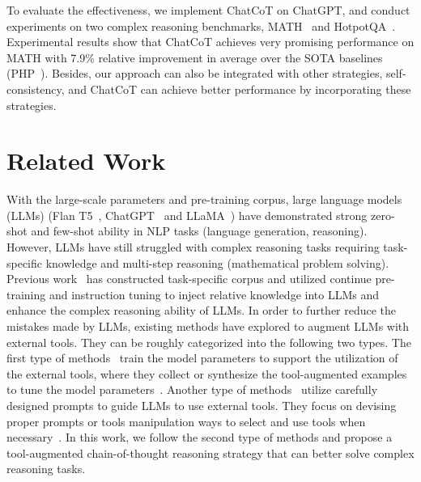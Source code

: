 To evaluate the effectiveness, we implement ChatCoT on ChatGPT, and conduct experiments on two complex reasoning benchmarks, \ie MATH~\cite{MATH} and HotpotQA~\cite{HotpotQA}.
Experimental results show that ChatCoT achieves very promising performance on MATH with 7.9\% relative improvement in average over the SOTA baselines (\ie PHP~\cite{PHP}).
Besides, our approach can also be integrated with other strategies, \eg self-consistency, and ChatCoT can achieve better performance by incorporating these strategies.

\section{Related Work}

With the large-scale parameters and pre-training corpus, large language models (LLMs) (\eg Flan T5~\cite{flant5}, ChatGPT~\cite{ChatGPT} and LLaMA~\cite{LLaMA}) have demonstrated strong zero-shot and few-shot ability in NLP tasks (\eg language generation, reasoning).
However, LLMs have still struggled with complex reasoning tasks requiring task-specific knowledge and multi-step reasoning (\eg mathematical problem solving).
Previous work~\cite{jz1,jz2,wizardmath} has constructed task-specific corpus and utilized continue pre-training and instruction tuning to inject relative knowledge into LLMs and enhance the complex reasoning ability of LLMs.
In order to further reduce the mistakes made by LLMs, existing methods have explored to augment LLMs with external tools.
They can be roughly categorized into the following two types.
The first type of methods~\cite{Atlas, talm, TRICE} train the model parameters to support the utilization of the external tools, where they collect or synthesize the tool-augmented examples to tune the model parameters~\cite{Toolformer, gorilla, toolkengpt}.
Another type of methods~\cite{PAL, ReAct, carp} utilize carefully designed prompts to guide LLMs to use external tools. They focus on devising proper prompts or tools manipulation ways to select and use tools when necessary~\cite{TaskMatrix, hugginggpt, ReAct}.
In this work, we follow the second type of methods and propose a tool-augmented chain-of-thought reasoning strategy that can better solve complex reasoning tasks.

